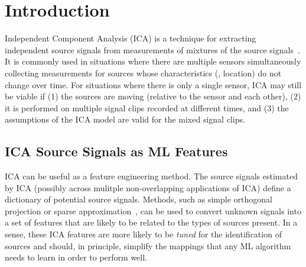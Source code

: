 \documentclass[10pt]{article}
\begin{document}
\section{Introduction}
Independent Component Analysis (ICA) is a technique for extracting independent source
signals from measurements of mixtures of the source signals~\cite{sklearn-bss,
hyvarinen:2000,tharwat:2021}. It is commonly used in situations where there are multiple
sensors simultaneously collecting measurements for sources whose characteristics (\eg,
location) do not change over time. For situations where there is only a single sensor, ICA
may still be viable if (1) the sources are moving (relative to the sensor and each other),
(2) it is performed on multiple signal clips recorded at different times, and (3) the
assumptions of the ICA model are valid for the mixed signal clips.

\subsection*{ICA Source Signals as ML Features}
ICA can be useful as a feature engineering method. The source signals estimated by ICA
(possibly across mulitple non-overlapping applications of ICA) define a dictionary of
potential source signals. Methods, such as simple orthogonal projection or sparse
approximation~\cite{blumensath:2009,needell:2009,wikipedia-sparse-approximation}, can be
used to convert unknown signals into a set of features that are likely to be related to
the types of sources present. In a sense, these ICA features are more likely to be
\emph{tuned} for the identification of sources and should, in principle, simplify the
mappings that any ML algorithm needs to learn in order to perform well.
\end{document}
